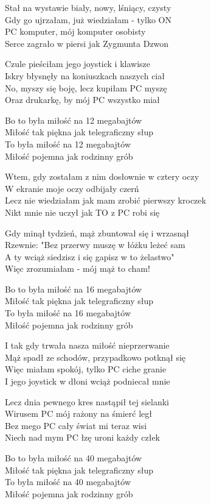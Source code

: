 \begin{text}
    Stał na wystawie biały, nowy, lśniący, czysty\\
    Gdy go ujrzałam, już wiedziałam - tylko ON\\
    PC komputer, mój komputer osobisty\\
    Serce zagrało w piersi jak Zygmunta Dzwon

    Czule pieściłam jego joystick i klawisze\\
    Iskry błysnęły na koniuszkach naszych ciał\\
    No, myszy się boję, lecz kupiłam PC myszę\\
    Oraz drukarkę, by mój PC wszystko miał

    Bo to była miłość na 12 megabajtów\\
    Miłość tak piękna jak telegraficzny słup\\
    To była miłość na 12 megabajtów\\
    Miłość pojemna jak rodzinny grób

    Wtem, gdy zostałam z nim dosłownie w cztery oczy\\
    W ekranie moje oczy odbijały czerń\\
    Lecz nie wiedziałam jak mam zrobić pierwszy kroczek\\
    Nikt mnie nie uczył jak TO z PC robi się

    Gdy minął tydzień, mąż zbuntował się i wrzasnął\\
    Rzewnie: "Bez przerwy muszę w łóżku leżeć sam\\
    A ty wciąż siedzisz i się gapisz w to żelastwo"\\
    Więc zrozumiałam - mój mąż to cham!

    Bo to była miłość na 16 megabajtów\\
    Miłość tak piękna jak telegraficzny słup\\
    To była miłość na 16 megabajtów\\
    Miłość pojemna jak rodzinny grób

    I tak gdy trwała nasza miłość nieprzerwanie\\
    Mąż spadł ze schodów, przypadkowo potknął się\\
    Więc miałam spokój, tylko PC ciche granie\\
    I jego joystick w dłoni wciąż podniecał mnie

    Lecz dnia pewnego kres nastąpił tej sielanki\\
    Wirusem PC mój rażony na śmierć legł\\
    Bez mego PC cały świat mi teraz wisi\\
    Niech nad mym PC łzę uroni każdy człek

    Bo to była miłość na 40 megabajtów\\
    Miłość tak piękna jak telegraficzny słup\\
    To była miłość na 40 megabajtów\\
    Miłość pojemna jak rodzinny grób
\end{text}
\begin{chord}

\end{chord}